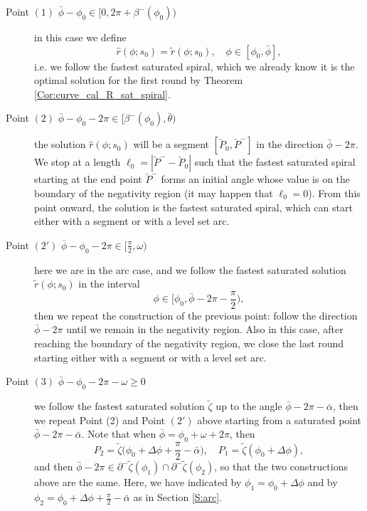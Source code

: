\documentclass[reqno]{amsart}
\theoremstyle{definition} \newtheorem{definition}{Definition}[section]
\theoremstyle{definition} \newtheorem{remark}[definition]{Remark}
\theoremstyle{plain} \newtheorem{lemma}[definition]{Lemma}
\theoremstyle{plain} \newtheorem{proposition}[definition]{Proposition}
\theoremstyle{plain} \newtheorem{theorem}[definition]{Theorem}
\theoremstyle{plain} \newtheorem{corollary}[definition]{Corollary}
\theoremstyle{definition} \newtheorem{example}[definition]{Example}
\theoremstyle{plain} \newtheorem{claim}[clai]{Claim}
\theoremstyle{definition} \newtheorem{assumption}[definition]{Assumption}
\theoremstyle{definition} \newtheorem{observation}[definition]{Observation}
\newcommand{\1}{\mathbbm 1}
\numberwithin{equation}{section} %
\theoremstyle{plain} \newtheorem*{theorem*}{Theorem}
\theoremstyle{plain} \newtheorem{mthm}[maintheorem]{Main Theorem}
\theoremstyle{plain} \newtheorem*{mthm*}{Main Theorem}
\theoremstyle{plain} \newtheorem*{conjecture*}{Conjecture}
\theoremstyle{plain} \newtheorem{conjecture}[definition]{Conjecture}
\theoremstyle{plain} \newtheorem*{problem*}{Problem}
\begin{document}
\begin{description}
\item[Point $(1)$ $\bar \phi -\phi_0 \in [0,2\pi +\beta^-(\phi_0))$] in this case we define
$$
\hat r(\phi;s_0) = \tilde r(\phi;s_0), \quad \phi \in [\phi_0,\bar \phi],
$$
i.e. we follow the fastest saturated spiral, which we already know it is the optimal solution for the first round by Theorem \ref{Cor:curve_cal_R_sat_spiral}.
\item[Point $(2)$ $\bar \phi - \phi_0 - 2\pi \in [\beta^-(\phi_0),\bar \theta)$] the solution $\hat r(\phi;s_0)$ will be a segment $[\check P_0,\check P^-]$ in the direction $\bar \phi - 2\pi$. We stop at a length $\ell_0 = |\check P^- - \check P_0|$ such that the fastest saturated spiral starting at the end point $\check P^-$ forms an initial angle whose value is on the boundary of the negativity region (it may happen that $\ell_0 = 0$). From this point onward, the solution is the fastest saturated spiral, which can start either with a segment or with a level set arc.


\item[Point $(2')$  $\bar \phi - \phi_0 - 2\pi \in [\frac{\pi}{2},\omega)$] here we are in the arc case, and we follow the fastest saturated solution $\tilde r(\phi;s_0)$ in the interval
\begin{equation*}
\phi \in \bigg[ \phi_0,\bar \phi - 2\pi - \frac{\pi}{2} \bigg),
\end{equation*}
then we repeat the construction of the previous point: follow the direction $\bar \phi - 2\pi$ until we remain in the negativity region. Also in this case, after reaching the boundary of the negativity region, we close the last round starting either with a segment or with a level set arc.

\item[Point $(3)$    $\bar \phi - \phi_0 - 2\pi - \omega \geq 0$] we follow the fastest saturated solution $\tilde \zeta$ up to the angle $\bar \phi - 2\pi - \bar \alpha$, then we repeat Point (2) and Point $(2')$ above starting from a saturated point $\bar \phi - 2\pi - \bar \alpha$. Note that when $\bar \phi = \phi_0 + \omega + 2\pi$, then
\begin{equation*}
P_2 = \tilde \zeta \bigg( \phi_0 + \Delta \phi + \frac{\pi}{2} - \bar \alpha \bigg), \quad P_1 = \tilde \zeta(\phi_0 + \Delta \phi),
\end{equation*}
and then $\bar \phi - 2\pi \in \partial^- \tilde \zeta(\phi_1) \cap \partial^- \tilde \zeta(\phi_2)$, so that the two constructions above are the same. Here, we have indicated by $\phi_1=\phi_0+\Delta\phi$ and by $\phi_2=\phi_0+\Delta\phi+\frac{\pi}{2}-\bar\alpha$ as in Section \ref{S:arc}.
\end{description}
\end{document}
